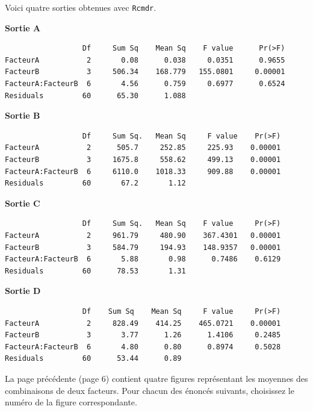 \begin{questions}
Voici quatre sorties obtenues avec \texttt{Rcmdr}.

\smallskip
{\bf Sortie A}
\begin{verbatim}
                  Df     Sum Sq    Mean Sq    F value      Pr(>F)    
FacteurA           2       0.08      0.038     0.0351      0.9655    
FacteurB           3     506.34    168.779   155.0801     0.00001
FacteurA:FacteurB  6       4.56      0.759     0.6977      0.6524    
Residuals         60      65.30      1.088                         
\end{verbatim}

{\bf Sortie B}
\begin{verbatim}
                  Df     Sum Sq.   Mean Sq     F value    Pr(>F)    
FacteurA           2      505.7     252.85     225.93    0.00001
FacteurB           3     1675.8     558.62     499.13    0.00001
FacteurA:FacteurB  6     6110.0    1018.33     909.88    0.00001
Residuals         60       67.2       1.12                           
\end{verbatim}

{\bf Sortie C}
\begin{verbatim}
                  Df     Sum Sq.   Mean Sq    F value     Pr(>F)    
FacteurA           2     961.79     480.90    367.4301   0.00001
FacteurB           3     584.79     194.93    148.9357   0.00001
FacteurA:FacteurB  6       5.88       0.98      0.7486    0.6129    
Residuals         60      78.53       1.31                         
\end{verbatim}

{\bf Sortie D}
\begin{verbatim}
                  Df    Sum Sq    Mean Sq     F value     Pr(>F)    
FacteurA           2     828.49    414.25    465.0721    0.00001
FacteurB           3       3.77      1.26      1.4106     0.2485    
FacteurA:FacteurB  6       4.80      0.80      0.8974     0.5028    
Residuals         60      53.44      0.89               
\end{verbatim}

\medskip
La page précédente (page 6) contient quatre figures représentant les moyennes des combinaisons de deux facteurs.
Pour chacun des énoncés suivants, choisissez le numéro de la figure correspondante.

\medskip\medskip
{}
\end{questions}
